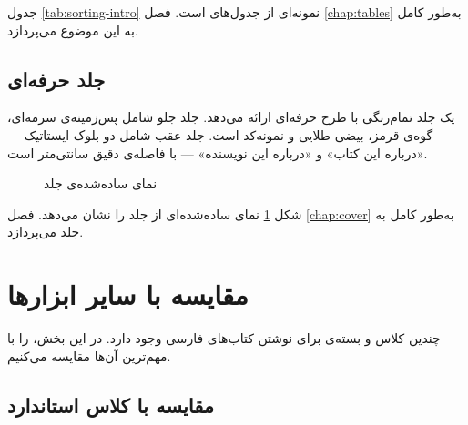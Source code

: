 
جدول \cref{tab:sorting-intro} نمونه‌ای از جدول‌های
 است. فصل \cref{chap:tables} به‌طور
کامل به این موضوع می‌پردازد.

\subsection{جلد حرفه‌ای}
\label{sec:introduction-cover}

 یک جلد تمام‌رنگی با طرح حرفه‌ای ارائه
می‌دهد. جلد جلو شامل پس‌زمینه‌ی سرمه‌ای، گوه‌ی
قرمز، بیضی طلایی و نمونه‌کد  است. جلد
عقب شامل دو بلوک ایستاتیک — «درباره این کتاب» و
«درباره این نویسنده» — با فاصله‌ی دقیق
 سانتی‌متر است.

\begin{figure}[h]
\centering
\begin{latin}
\end{latin}
\caption{نمای ساده‌شده‌ی جلد }
\label{fig:cover-intro}
\end{figure}


شکل \cref{fig:cover-intro} نمای ساده‌شده‌ای از
جلد را نشان می‌دهد. فصل \cref{chap:cover} به‌طور
کامل به جلد می‌پردازد.

\section{مقایسه با سایر ابزارها}
\label{sec:introduction-comparison}

چندین کلاس و بسته‌ی  برای نوشتن
کتاب‌های فارسی وجود دارد. در این بخش،
 را با مهم‌ترین آن‌ها مقایسه
می‌کنیم.

\subsection{مقایسه با کلاس  استاندارد}
\label{sec:introduction-vs-book}

